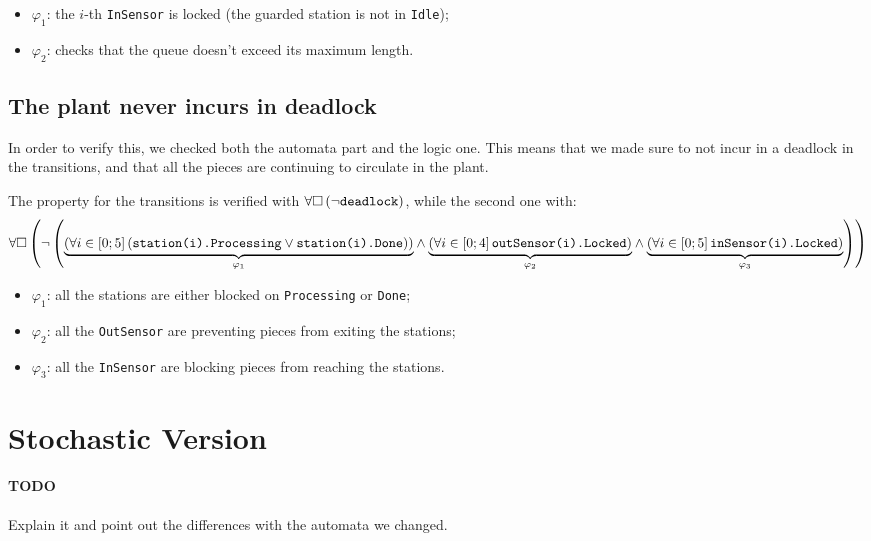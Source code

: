 \documentclass[a4paper]{article}
\newcommand{\formulacomment}[2]{\underset{\varphi_{#1}}{\underbrace{#2}}}
\newcommand{\formulatext}[1]{\text{\texttt{#1}}}
\begin{document}
    \begin{itemize}
        \item \(\varphi_1\): the \(i\)-th \texttt{InSensor} is locked (the guarded station is not in \texttt{Idle});
        \item \(\varphi_2\): checks that the queue doesn't exceed its maximum length.
    \end{itemize}

    \subsection{The plant never incurs in deadlock} \label{property:4}

    In order to verify this, we checked both the automata part and the logic one. This means that we made sure to not incur in a deadlock in the transitions, and that all the pieces are continuing to circulate in the plant.\medskip

    The property for the transitions is verified with \(\forall \square \left(\neg \formulatext{deadlock}\right)\), while the second one with:
    {
        \scriptsize
        \[\forall \square \left(\neg \left(\formulacomment{1}{\left(\forall i \in \left[0; 5\right] \left(\formulatext{station(i).Processing} \vee \formulatext{station(i).Done}\right)\right)} \wedge \formulacomment{2}{\left(\forall i \in \left[0; 4\right] \formulatext{outSensor(i).Locked}\right)} \wedge \formulacomment{3}{\left(\forall i \in \left[0; 5\right] \formulatext{inSensor(i).Locked}\right)}\right)\right)\]
    }

    \begin{itemize}
        \item \(\varphi_1\): all the stations are either blocked on \texttt{Processing} or \texttt{Done};
        \item \(\varphi_2\): all the \texttt{OutSensor} are preventing pieces from exiting the stations;
        \item \(\varphi_3\): all the \texttt{InSensor} are blocking pieces from reaching the stations.
    \end{itemize}

    \section{Stochastic Version}

    \paragraph{TODO} Explain it and point out the differences with the automata we changed.
\end{document}
